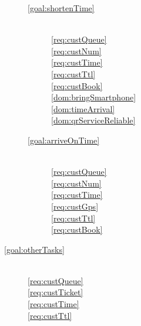 \begin{description}
\begin{description}
            \item[\ref{goal:shortenTime}]  ~\\

            \ref{req:custQueue}  ~\\
            \ref{req:custNum}  ~\\
            \ref{req:custTime}  ~\\
            \ref{req:custTtl}  ~\\
            \ref{req:custBook}  ~\\

            \ref{dom:bringSmartphone}  ~\\
            \ref{dom:timeArrival}  ~\\
            \ref{dom:qrServiceReliable}  ~\\


            \item[\ref{goal:arriveOnTime}]  ~\\

            \ref{req:custQueue}  ~\\
            \ref{req:custNum}  ~\\
            \ref{req:custTime}  ~\\
            \ref{req:custGps}  ~\\
            \ref{req:custTtl}  ~\\
            \ref{req:custBook}  ~\\
        \end{description}


        \item[\ref{goal:otherTasks}]  ~\\

        \ref{req:custQueue}  ~\\
        \ref{req:custTicket}  ~\\
        \ref{req:custTime}  ~\\
        \ref{req:custTtl}  ~\\


\end{description}
